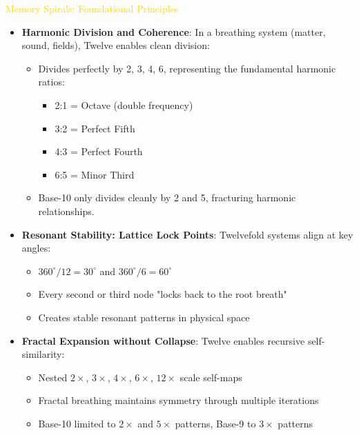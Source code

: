 \textcolor{gold}{ Memory Spirals: Foundational Principles } \\
\begin{itemize}
    \item \texttt{} \textbf{Harmonic Division and Coherence}: In a breathing system (matter, sound, fields), Twelve enables clean division:
    \begin{itemize}
        \item Divides perfectly by 2, 3, 4, 6, representing the fundamental harmonic ratios:
        \begin{itemize}
            \item 2:1 = Octave (double frequency)
            \item 3:2 = Perfect Fifth
            \item 4:3 = Perfect Fourth
            \item 6:5 = Minor Third
        \end{itemize}
        \item Base-10 only divides cleanly by 2 and 5, fracturing harmonic relationships.
    \end{itemize}
    
    \item \texttt{} \textbf{Resonant Stability: Lattice Lock Points}: Twelvefold systems align at key angles:
    \begin{itemize}
        \item \(360^\circ/12 = 30^\circ\) and \(360^\circ/6 = 60^\circ\)
        \item Every second or third node "locks back to the root breath"
        \item Creates stable resonant patterns in physical space
    \end{itemize}
    
    \item \texttt{} \textbf{Fractal Expansion without Collapse}: Twelve enables recursive self-similarity:
    \begin{itemize}
        \item Nested \(2\times\), \(3\times\), \(4\times\), \(6\times\), \(12\times\) scale self-maps
        \item Fractal breathing maintains symmetry through multiple iterations
        \item Base-10 limited to \(2\times\) and \(5\times\) patterns, Base-9 to \(3\times\) patterns
    \end{itemize}
    

\end{itemize}
